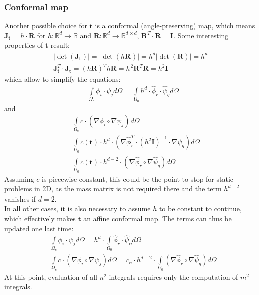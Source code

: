 \documentclass{IOS-Book-Article}
\theoremstyle{plain}
\theoremstyle{definition}
\begin{document}
\subsubsection{Conformal map}

Another possible choice for $\mathbf t$ is a conformal (angle-preserving) map, which means $\mathbf J_{\mathbf t} = h \cdot \mathbf R$ for $h : \mathbb{R}^d \rightarrow \mathbb{R}$ and $\mathbf R : \mathbb{R}^d \rightarrow \mathbb{R}^{d \times d}$, $\mathbf R^T \cdot \mathbf R = \mathbf I$. Some interesting properties of $\mathbf t$ result:
\begin{align}
	\left| \det(\mathbf J_{\mathbf t}) \right | = \left| \det(h \mathbf R) \right | = h^d \left| \det(\mathbf R) \right | = h^d \\
	\mathbf J_{\mathbf t}^T \cdot \mathbf J_{\mathbf t} = (h \mathbf R)^T h \mathbf R = h^2 \mathbf R^T \mathbf R = h^2 \mathbf I
\end{align}
which allow to simplify the equations:
\begin{align*}
	& \int \limits_{\Omega_e} \phi_i \cdot \psi_j d\Omega = \int \limits_{\Omega_0} h^d \cdot \hat \phi_r \cdot \hat \psi_q d\Omega
\end{align*}
and
\begin{align*}
	& \int \limits_{\Omega_e} c \cdot (\nabla \phi_i \circ \nabla \psi_j) d\Omega \\
	=& \int \limits_{\Omega_0} c( \mathbf t ) \cdot h^d \cdot (\nabla \hat \phi_r^T \cdot (h^2 \mathbf I)^{-1} \cdot \nabla \hat \psi_q) d\Omega \\
	=& \int \limits_{\Omega_0} c( \mathbf t ) \cdot h^{d-2} \cdot (\nabla \hat \phi_r \circ \nabla \hat \psi_q) d\Omega
\end{align*}
Assuming $c$ is piecewise constant, this could be the point to stop for static problems in 2D, as the mass matrix is not required there and the term $h^{d-2}$ vanishes if $d = 2$.\\
In all other cases, it is also necessary to assume $h$ to be constant to continue, which effectively makes $\mathbf t$ an affine conformal map. The terms can thus be updated one last time:
\begin{align*}
	& \int \limits_{\Omega_e} \phi_i \cdot \psi_j d\Omega = h^d \cdot \int \limits_{\Omega_0} \hat \phi_r \cdot \hat \psi_q d\Omega \\
	& \int \limits_{\Omega_e} c \cdot (\nabla \phi_i \circ \nabla \psi_j) d\Omega = c_e \cdot h^{d-2} \cdot \int \limits_{\Omega_0} (\nabla \hat \phi_r \circ \nabla \hat \psi_q) d\Omega
\end{align*}
At this point, evaluation of all $n^2$ integrals requires only the computation of $m^2$ integrals.
\end{document}
